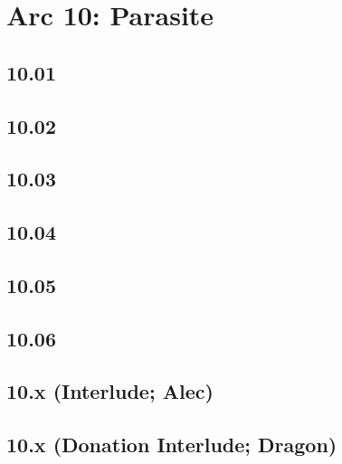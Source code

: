 \part{Arc 10: Parasite}
 \chapter{10.01}
 \chapter{10.02}
 \chapter{10.03}
 \chapter{10.04}
 \chapter{10.05}
 \chapter{10.06}
 \chapter{10.x (Interlude; Alec)}
 \chapter{10.x (Donation Interlude; Dragon)}










